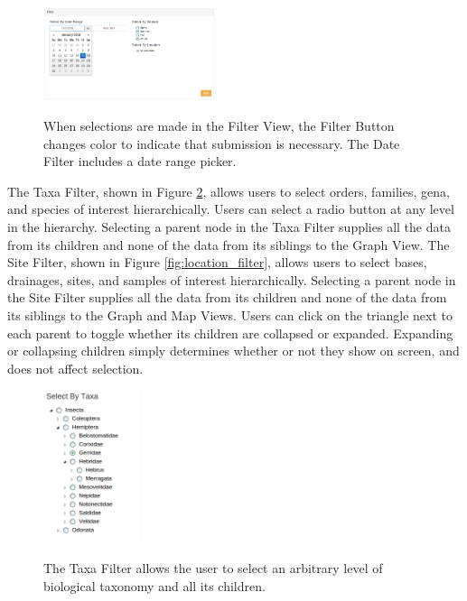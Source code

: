 \documentclass[10pt,peerreview,onecolumn,draftclsnofoot,technote]{IEEEtran}
\begin{document}
\begin{figure}[h]
\caption{
  When selections are made in the Filter View, the Filter Button changes color to indicate that submission is necessary.
  The Date Filter includes a date range picker.
}
\centering
\includegraphics[width=0.45\textwidth]{images/date_filter.png}
\label{fig:date_filter}
\end{figure}

The Taxa Filter, shown in Figure \ref{fig:taxa_filter}, allows users to select orders, families, gena, and species of interest hierarchically.
Users can select a radio button at any level in the hierarchy.
Selecting a parent node in the Taxa Filter supplies all the data from its children and none of the data from its siblings to the Graph View.
The Site Filter, shown in Figure \ref{fig:location_filter}, allows users to select bases, drainages, sites, and samples of interest hierarchically.
Selecting a parent node in the Site Filter supplies all the data from its children and none of the data from its siblings to the Graph and Map Views.
Users can click on the triangle next to each parent to toggle whether its children are collapsed or expanded.
Expanding or collapsing children simply determines whether or not they show on screen, and does not affect selection.

\begin{figure}[h]
\caption{
  The Taxa Filter allows the user to select an arbitrary level of biological taxonomy and all its children.
}
\centering
\includegraphics[width=0.25\textwidth]{images/taxa_filter.png}
\label{fig:taxa_filter}
\end{figure}
\end{document}

